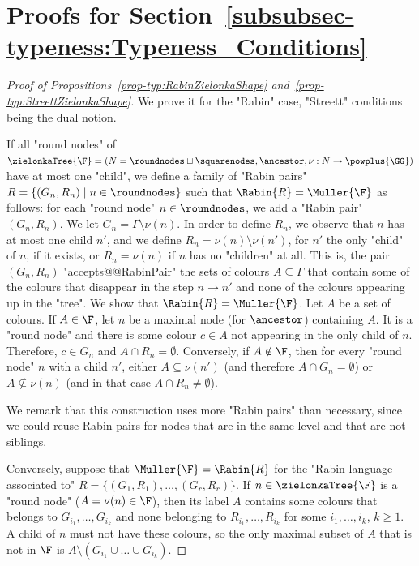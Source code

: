 \documentclass[10pt,a4paper]{amsart}
\begin{document}
	\section{Proofs for Section~\ref{subsubsec-typeness:Typeness_Conditions}}
	\label{sec:appendix-typeness-proofs-Muller-conditions}
	\begin{proof}[Proof of Propositions~\ref{prop-typ:RabinZielonkaShape} and~\ref{prop-typ:StreettZielonkaShape}]
		We prove it for the "Rabin" case, "Streett" conditions being the dual notion.
			
		If all "round nodes" of $\zielonkaTree{\F} = (N =\roundnodes\sqcup \squarenodes, \ancestor, \nu :N \to \powplus{\GG})$ have at most one "child", we define a family of "Rabin pairs" $R = \{(G_n,R_n)\mid n\in \roundnodes\}$ such that $\Rabin{R}= \Muller{\F}$ as follows: for each "round node" $n\in \roundnodes$, we add a "Rabin pair" $(G_n,R_n)$. We let $G_n= \Gamma \setminus \nu(n)$. In order to define $R_n$, we observe that $n$ has at most one child $n'$, and we define $R_n=\nu(n)\setminus \nu(n')$, for $n'$ the only "child" of $n$, if it exists, or $R_n=\nu(n)$ if $n$ has no "children" at all. This is, the pair $(G_n,R_n)$ "accepts@@RabinPair" the sets of colours $A\subseteq \Gamma$ that contain some of the colours that disappear in the step $n\rightarrow n'$ and none of the colours appearing up in the "tree". We show that $\Rabin{R}= \Muller{\F}$. Let $A$ be a set of colours. If $A\in \F$, let $n$ be a maximal node (for $\ancestor$) containing $A$. It is a "round node" and there is some colour $c\in A$ not appearing in the only child of $n$. Therefore, $c\in G_n$ and $A \cap R_n=\emptyset$. Conversely, if $A\notin \F$, then for every "round node" $n$ with a child $n'$, either $A\subseteq \nu(n')$ (and therefore $A\cap G_n = \emptyset$) or $A \nsubseteq \nu(n)$ (and in that case $A\cap R_n \neq \emptyset$).
			
		We remark that this construction uses more "Rabin pairs" than necessary, since we could reuse Rabin pairs for nodes that are in the same level and that are not siblings.
			
		Conversely, suppose that $\Muller{\F} = \Rabin{R}$ for the "Rabin language associated to" $R=\{(G_1,R_1),\dots,(G_r,R_r)\}$. If $n \in \zielonkaTree{\F}$ is a "round node" ($A=\nu(n)\in \F$), then its label $A$ contains some colours that belongs to $G_{i_1},\dots,G_{i_k}$ and none belonging to $R_{i_1},\dots,R_{i_k}$ for some $i_1,\dots, i_k$, $k\geq 1$. A child of $n$ must not have these colours, so the only maximal subset of $A$ that is not in $\F$ is $A\setminus (G_{i_1}\cup \dots \cup G_{i_k})$.				
\end{proof}
	
\end{document}

